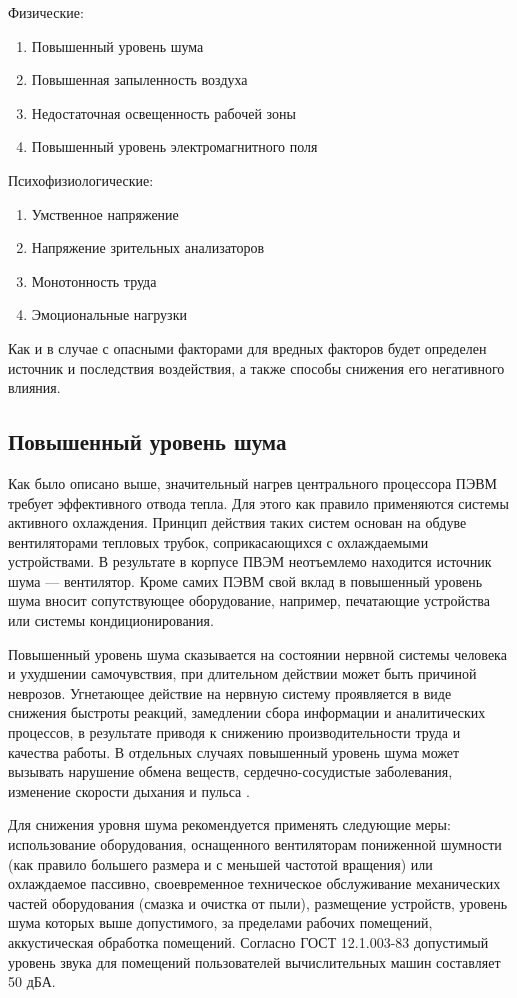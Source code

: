 \documentclass[14pt,oneside,final]{extreport}
\begin{document}
	\noindent Физические:
		\begin{enumerate}[label*=1.\arabic*.]
	 		\item Повышенный уровень шума
	 		\item Повышенная запыленность воздуха
	 		\item Недостаточная освещенность рабочей зоны
	 		\item Повышенный уровень электромагнитного поля
		\end{enumerate}
	Психофизиологические:
		\begin{enumerate}[label*=2.\arabic*.]
			\item Умственное напряжение 
			\item Напряжение зрительных анализаторов
			\item Монотонность труда
			\item Эмоциональные нагрузки
		\end{enumerate}

	Как и в случае с опасными факторами для вредных факторов будет определен источник и последствия воздействия, а также способы снижения его негативного влияния.
	
	\subsection{Повышенный уровень шума}
	Как было описано выше, значительный нагрев центрального процессора ПЭВМ требует эффективного отвода тепла. Для этого как правило применяются системы активного охлаждения. Принцип действия таких систем основан на обдуве вентиляторами тепловых трубок, соприкасающихся с охлаждаемыми устройствами. В результате в корпусе ПВЭМ неотъемлемо находится источник шума --- вентилятор. Кроме самих ПЭВМ свой вклад в повышенный уровень шума вносит сопутствующее оборудование, например, печатающие устройства или системы кондиционирования. 
	
	Повышенный уровень шума сказывается на состоянии нервной системы человека и ухудшении самочувствия, при длительном действии может быть причиной неврозов. Угнетающее действие на нервную систему проявляется в виде снижения быстроты реакций, замедлении сбора информации и аналитических процессов, в результате приводя к снижению производительности труда и качества работы. В отдельных случаях повышенный уровень шума может вызывать нарушение обмена веществ, сердечно-сосудистые заболевания, изменение скорости дыхания и пульса \cite{book:BZD}. 
 
	
	Для снижения уровня шума рекомендуется применять следующие меры: использование оборудования, оснащенного вентиляторам пониженной шумности (как правило большего размера и с меньшей частотой вращения) или охлаждаемое пассивно, своевременное техническое обслуживание механических частей оборудования (смазка и очистка от пыли), размещение устройств, уровень шума которых выше допустимого, за пределами рабочих помещений, аккустическая обработка помещений. Согласно ГОСТ 12.1.003-83 допустимый уровень звука для помещений пользователей вычислительных машин составляет 50 дБА.
\end{document}
